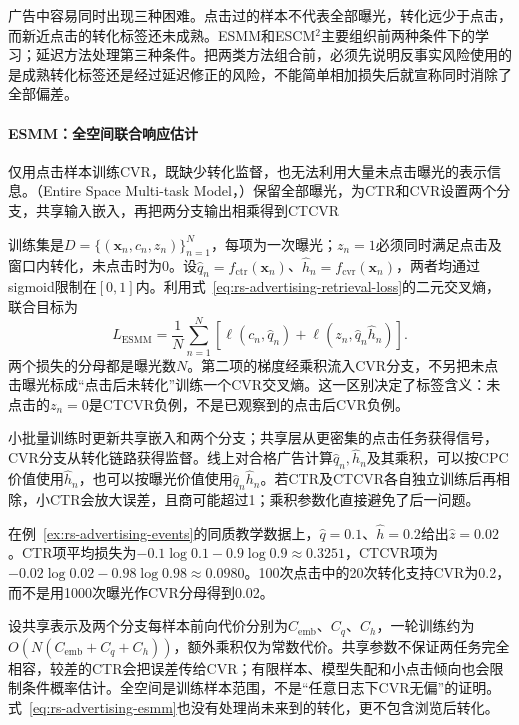 广告中容易同时出现三种困难。点击过的样本不代表全部曝光，转化远少于点击，而新近点击的转化标签还未成熟。ESMM和ESCM$^2$主要组织前两种条件下的学习；延迟方法处理第三种条件。把两类方法组合前，必须先说明反事实风险使用的是成熟转化标签还是经过延迟修正的风险，不能简单相加损失后就宣称同时消除了全部偏差。

\paragraph{ESMM：全空间联合响应估计}
\label{sec:rs-advertising-esmm}

仅用点击样本训练CVR，既缺少转化监督，也无法利用大量未点击曝光的表示信息。（Entire Space Multi-task Model，）保留全部曝光，为CTR和CVR设置两个分支，共享输入嵌入，再把两分支输出相乘得到CTCVR

训练集是$D=\{(\bm{x}_n,c_n,z_n)\}_{n=1}^{N}$，每项为一次曝光；$z_n=1$必须同时满足点击及窗口内转化，未点击时为0。设$\widehat q_n=f_{\mathrm{ctr}}(\bm{x}_n)$、$\widehat h_n=f_{\mathrm{cvr}}(\bm{x}_n)$，两者均通过sigmoid限制在$[0,1]$内。利用式~\eqref{eq:rs-advertising-retrieval-loss}的二元交叉熵，联合目标为
\begin{equation}
  L_{\mathrm{ESMM}}
  =\frac{1}{N}\sum_{n=1}^{N}
    \left[
      \ell(c_n,\widehat q_n)
      +\ell(z_n,\widehat q_n\widehat h_n)
    \right].
  \label{eq:rs-advertising-esmm}
\end{equation}
两个损失的分母都是曝光数$N$。第二项的梯度经乘积流入CVR分支，不另把未点击曝光标成“点击后未转化”训练一个CVR交叉熵。这一区别决定了标签含义：未点击的$z_n=0$是CTCVR负例，不是已观察到的点击后CVR负例。

小批量训练时更新共享嵌入和两个分支；共享层从更密集的点击任务获得信号，CVR分支从转化链路获得监督。线上对合格广告计算$\widehat q_n,\widehat h_n$及其乘积，可以按CPC价值使用$\widehat h_n$，也可以按曝光价值使用$\widehat q_n\widehat h_n$。若CTR及CTCVR各自独立训练后再相除，小CTR会放大误差，且商可能超过1；乘积参数化直接避免了后一问题。

在例~\ref{ex:rs-advertising-events}的同质教学数据上，$\widehat q=0.1$、$\widehat h=0.2$给出$\widehat z=0.02$。CTR项平均损失为$-0.1\log0.1-0.9\log0.9\approx0.3251$，CTCVR项为$-0.02\log0.02-0.98\log0.98\approx0.0980$。100次点击中的20次转化支持CVR为0.2，而不是用1000次曝光作CVR分母得到0.02。

设共享表示及两个分支每样本前向代价分别为$C_{\mathrm{emb}}$、$C_q$、$C_h$，一轮训练约为$O(N(C_{\mathrm{emb}}+C_q+C_h))$，额外乘积仅为常数代价。共享参数不保证两任务完全相容，较差的CTR会把误差传给CVR；有限样本、模型失配和小点击倾向也会限制条件概率估计。全空间是训练样本范围，不是“任意日志下CVR无偏”的证明。式~\eqref{eq:rs-advertising-esmm}也没有处理尚未来到的转化，更不包含浏览后转化。

